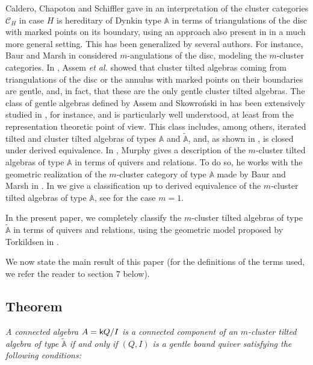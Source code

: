 \documentclass{amsart}
\theoremstyle{plain}
\theoremstyle{definition}
\begin{document}
Caldero, Chapoton and Schiffler gave in \cite{CSS06} an interpretation of the cluster categories $\mathcal{C}_H$ in case $H$ is hereditary of Dynkin type $\mathbb{A}$ in terms of triangulations of the disc with marked points on its boundary, using an approach also present in \cite{FST08} in a much more general setting. This has been generalized by several authors. For instance, Baur and Marsh in \cite{BM08} considered $m$-angulations of the disc, modeling the $m$-cluster categories. In \cite{ABCP09}, Assem \emph{et al.} showed that cluster tilted algebras coming from triangulations of the disc or the annulus with marked points on their boundaries are gentle, and, in fact, that these are the only gentle cluster tilted algebras. The class of gentle algebras defined by Assem and Skowro\'nski in \cite{AS87} has been extensively studied in \cite{AH81, Avella-Alaminos2008, BB10, Buan2008, Murphy2010, SZ03}, for instance, and is particularly well understood, at least from the representation theoretic point of view. This class includes, among others, iterated tilted and cluster
tilted algebras of types $\mathbb{A}$ and $\tilde{\mathbb{A}}$, and, as shown in \cite{SZ03}, is closed under derived equivalence. In \cite{Murphy2010}, Murphy gives a description of the $m$-cluster tilted algebras of  type $\mathbb{A}$ in terms of quivers and relations. To do so, he works with the geometric realization of the $m$-cluster category of type $\mathbb{A}$   made by Baur and Marsh in \cite{BM08}. In \cite{GubBust} we give a classification up to derived equivalence of the $m$-cluster tilted algebras of  type $\mathbb{A}$, see \cite{BB10} for the case $m=1$.

In the present paper, we completely classify the $m$-cluster tilted algebras of  type $\tilde{\mathbb{A}}$ in terms of quivers and relations, using the geometric model proposed by Torkildsen in \cite{T12-arxiv}.

We now state the main result of this paper (for the definitions of the terms used, we refer the reader to section 7 below).

\subsection*{Theorem }\textit{ A connected algebra $A={{\normalfont{\textsf{k}}}} Q/I$ is  a connected component of an $m$-cluster tilted algebra of type $\widetilde{\mathbb{A}}$ if and only if  $(Q,I)$ is a gentle bound quiver satisfying the following conditions: }
\end{document}
